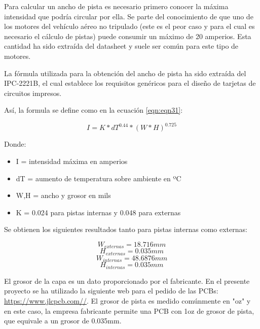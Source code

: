 Para calcular un ancho de pista es necesario primero conocer la máxima intensidad que podría circular por ella. Se parte del conocimiento de que uno de los motores del vehículo aéreo no tripulado (este es el peor caso y para el cual es necesario el cálculo de pistas) puede consumir un máximo de 20 amperios. Esta cantidad ha sido extraída del datasheet y suele ser común para este tipo de motores. \newline

La fórmula utilizada para la obtención del ancho de pista ha sido extraída del IPC-2221B, el cual establece los requisitos genéricos para el diseño de tarjetas de circuitos impresos. \newline

Así, la formula se define como en la ecuación \ref{eqn:eqn31}: 

\begin{equation}
I = K * dT^{0.44}*(W*H)^{0.725}
\label{eqn:eqn31}
\end{equation}

Donde: 
\begin{itemize}
	\item I = intensidad máxima en amperios
	\item dT = aumento de temperatura sobre ambiente en ºC
	\item W,H = ancho y grosor en mils
	\item K = 0.024 para pistas internas y 0.048 para externas
\end{itemize}

Se obtienen los siguientes resultados tanto para pistas internas como externas: 

\begin{equation*}
W_{externas} = 18.716 mm 
\end{equation*} 
\begin{equation*}
H_{externas} = 	0.035 mm
\end{equation*}
\begin{equation*}
W_{internas} =  48.6876 mm 
\end{equation*} 
\begin{equation*}
H_{internas} = 	0.035 mm
\end{equation*}

El grosor de la capa es un dato proporcionado por el fabricante. En el presente proyecto se ha utilizado la siguiente web para el pedido de las PCBs: \url{https://www.jlcpcb.com//}. \newline 
El grosor de pista es medido comúnmente en "oz" y en este caso, la empresa fabricante permite una PCB con 1oz de grosor de pista, que equivale a un grosor de 0.035mm.\newline

